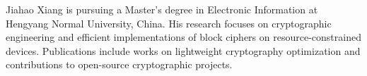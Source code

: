 \documentclass[journal]{IEEEtran}
\begin{document}












\begin{IEEEbiography}{Jiahao Xiang}
    is pursuing a Master's degree in Electronic Information at Hengyang Normal University, China. His research focuses on cryptographic engineering and efficient implementations of block ciphers on resource-constrained devices. Publications include works on lightweight cryptography optimization and contributions to open-source cryptographic projects.
\end{IEEEbiography}
\end{document}
